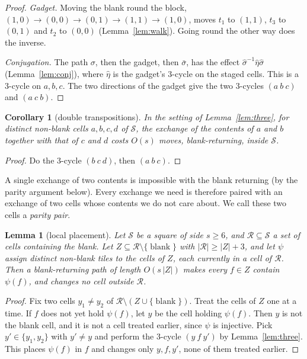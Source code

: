 \documentclass[11pt]{amsart}
\newtheorem{lemma}[theorem]{Lemma}
\newtheorem{corollary}[theorem]{Corollary}
\theoremstyle{definition}
\newcommand{\blank}{\operatorname{blank}}
\begin{document}
\begin{proof}
\emph{Gadget.} Moving the blank round the block, $(1,0)\to(0,0)\to(0,1)\to(1,1)\to(1,0)$, moves $t_1$ to $(1,1)$,
$t_3$ to $(0,1)$ and $t_2$ to $(0,0)$ (Lemma~\ref{lem:walk}). Going round the other way does the inverse.

\emph{Conjugation.} The path $\sigma$, then the gadget, then $\bar\sigma$, has the effect $\hat\sigma^{-1}\hat\eta\hat\sigma$
(Lemma~\ref{lem:conj}), where $\hat\eta$ is the gadget's $3$-cycle on the staged cells. This is a $3$-cycle on $a,b,c$.
The two directions of the gadget give the two $3$-cycles $(a\ b\ c)$ and $(a\ c\ b)$.
\end{proof}

\begin{corollary}[double transpositions]\label{cor:double}
In the setting of Lemma~\ref{lem:three}, for distinct non-blank cells $a,b,c,d$ of $\mathcal S$, the
exchange of the contents of $a$ and $b$ together with that of $c$ and $d$ costs
$O(s)$ moves, blank-returning, inside $\mathcal S$.
\end{corollary}

\begin{proof}
Do the $3$-cycle $(b\ c\ d)$, then $(a\ b\ c)$.
\end{proof}

A single exchange of two contents is impossible with the blank returning (by
the parity argument below). Every exchange we need is therefore paired with an exchange of
two cells whose contents we do not care about. We call these two cells a \emph{parity pair}.

\begin{lemma}[local placement]\label{lem:place}
Let $\mathcal S$ be a square of side $s\ge6$, and $\mathcal R\subseteq\mathcal S$ a set of cells containing the blank. Let
$Z\subseteq \mathcal R\setminus\{\blank\}$ with $|\mathcal R|\ge|Z|+3$, and let $\psi$ assign distinct non-blank tiles to the cells of $Z$,
each currently in a cell of $\mathcal R$. Then a blank-returning path of length $O(s\,|Z|)$ makes every $f\in Z$ contain
$\psi(f)$, and changes no cell outside $\mathcal R$.
\end{lemma}

\begin{proof}
Fix two cells $y_1\neq y_2$ of $\mathcal R\setminus(Z\cup\{\blank\})$. Treat the cells of $Z$ one at a time. If $f$ does not yet
hold $\psi(f)$, let $y$ be the cell holding $\psi(f)$. Then $y$ is not the blank cell, and it is not a cell treated
earlier, since $\psi$ is injective. Pick $y'\in\{y_1,y_2\}$ with $y'\ne y$ and perform the $3$-cycle $(y\ f\ y')$ by
Lemma~\ref{lem:three}. This places $\psi(f)$ in $f$ and changes only $y,f,y'$, none of them treated earlier.
\end{proof}
\end{document}
